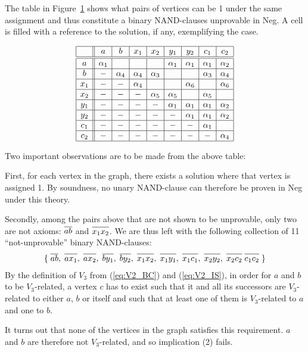 The table in Figure~\ref{fig:v3_counter_table} shows what pairs of vertices can be 1 under the same assignment and thus constitute a binary NAND-clauses unprovable in Neg.
A cell is filled with a reference to the solution, if any, exemplifying the case.
\begin{figure}[!h]
  \centering
  \[\begin{array}{|c||c|c|c|c|c|c|c|c|}
    \hline
    & a & b & x_1 & x_2 & y_1 & y_2 & c_1 & c_2 \\ \hline\hline
    a & \alpha_1 & & & & \alpha_1 & \alpha_1 & \alpha_1 & \alpha_2 \\ \hline
    b &-& \alpha_4 & \alpha_4 & \alpha_3 & & & \alpha_3 & \alpha_4 \\ \hline
    x_1 &-&-& \alpha_4 & & & \alpha_6 & & \alpha_6 \\ \hline
    x_2 &-&-&-& \alpha_5 & \alpha_5 & & \alpha_5 & \\ \hline
    y_1 &-&-&-&-& \alpha_1 & \alpha_1 & \alpha_1 & \alpha_2 \\ \hline
    y_2 &-&-&-&-&-& \alpha_1 & \alpha_1 & \alpha_2 \\ \hline
    c_1 &-&-&-&-&-&-& \alpha_1 & \\ \hline
    c_2 &-&-&-&-&-&-&-& \alpha_4 \\ \hline
  \end{array}\]
  \caption{}
  \label{fig:v3_counter_table}
\end{figure}
\FloatBarrier
Two important observations are to be made from the above table:

First, for each vertex in the graph, there exists a solution where that vertex is assigned 1.
By soundness, no unary NAND-clause can therefore be proven in Neg under this theory.

Secondly, among the pairs above that are not shown to be unprovable, only two are not axioms: $\ol{ab}$ and $\ol{x_1x_2}$.
We are thus left with the following collection of 11 ``not-unprovable'' binary NAND-clauses:
\begin{align}
  \{\; \ol{ab},\; \ol{ax_1},\; \ol{ax_2},\; \ol{by_1},\; \ol{by_2},\; \ol{x_1x_2},\; \ol{x_1y_1},\; \ol{x_1c_1},\; \ol{x_2y_2},\; \ol{x_2c_2} \; \ol{c_1c_2}\; \}
\end{align}
By the definition of $V_3$ from (\ref{eq:V2_BC}) and (\ref{eq:V2_IS}), in order for $a$ and $b$ to be $V_3$-related, a vertex $c$ has to exist such that it and all its successors are $V_3$-related to either $a$, $b$ or itself and such that at least one of them is $V_3$-related to $a$ and one to $b$.

It turns out that none of the vertices in the graph satisfies this requirement.
$a$ and $b$ are therefore not $V_3$-related, and so implication (2) fails.
